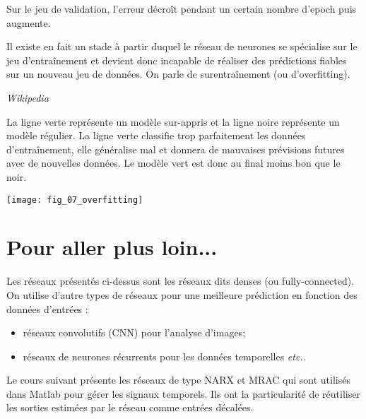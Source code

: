 Sur le jeu de validation, l'erreur décroît pendant un certain nombre d'epoch puis augmente. 

Il existe en fait un stade à partir duquel le réseau de neurones se spécialise sur le jeu d’entraînement et devient donc incapable de réaliser des prédictions fiables sur un nouveau jeu de données. On parle de surentraînement (ou d'overfitting).
 
\begin{exemple} \textit{Wikipedia} ~\\
\begin{minipage}[c]{.45\linewidth}
La ligne verte représente un modèle sur-appris et la ligne noire représente un modèle régulier. La ligne verte classifie trop parfaitement les données d’entraînement, elle généralise mal et donnera de mauvaises prévisions futures avec de nouvelles données. Le modèle vert est donc au final moins bon que le noir.
\end{minipage} \hfill
\begin{minipage}[c]{.45\linewidth}
\begin{center}
\texttt{[image: fig\_07\_overfitting]}
\end{center}
\end{minipage} 
\end{exemple}



\section{Pour aller plus loin...}

Les réseaux présentés ci-dessus sont les réseaux dits denses (ou fully-connected). On utilise d'autre types de réseaux pour une meilleure prédiction en fonction des données d'entrées : 
\begin{itemize}
\item réseaux convolutifs (CNN) pour l'analyse d'images;
\item réseaux de neurones récurrents pour les données temporelles \textit{etc..}
\end{itemize}

Le cours suivant présente les réseaux de type NARX et MRAC qui sont utilisés dans Matlab pour gérer les signaux temporels. Ils ont la particularité de réutiliser les sorties estimées par le réseau comme entrées décalées. 



